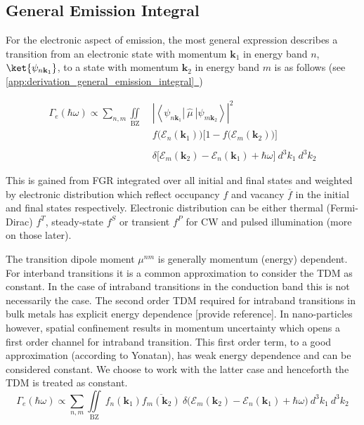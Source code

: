 \subsection{General Emission Integral}
\label{sec:general_emission_integral}

For the electronic aspect of emission, the most general expression describes a transition from an electronic state with momentum $\mathbf{k}_{1}$ in energy band $n$, $\ket{\psi_{n\mathbf{k}_{1}}}$, to a state with momentum $\mathbf{k}_{2}$ in energy band $m$ is as follows (see \hyperref[app:derivation_general_emission_integral]{\ref*{app:derivation_general_emission_integral}~})

\begin{align}
\Gamma_{e}(\hbar\omega) \propto \sum_{n, m} \iint\limits_{\text{BZ}} \;  &\left| \left\langle \psi_{n\mathbf{k}_{1}} | \ \hat{\mu} \ |\psi_{m\mathbf{k}_{2}}\right\rangle\right|^{2}  \\ &f\Big( \mathcal{E}_{n}(\mathbf{k}_{1}) \Big)\Bigg[ 1-f\Big( \mathcal{E}_{m}(\mathbf{k}_{2}) \Big)\Bigg] \\  \\ &\delta\Big[\mathcal{E}_{m}(\mathbf{k}_{2}) - \mathcal{E}_{n}(\mathbf{k}_{1}) + \hbar\omega \Big] \ d^{3}k_{1} \ d^{3}k_{2}
\label{eq:general_emission_integral}
\end{align}

This is gained from FGR integrated over all initial and final states and weighted by electronic distribution which reflect occupancy $f$ and vacancy $\overline{f}$ in the initial and final states respectively. Electronic distribution can be either thermal (Fermi-Dirac) $f^{T}$, steady-state $f^{S}$ or transient $f^{P}$ for CW and pulsed illumination (more on those later). 

The transition dipole moment $\mu^{nm}$ is generally momentum (energy) dependent. For interband transitions it is a common approximation to consider the TDM as constant. In the case of intraband transitions in the conduction band this is not necessarily the case. The second order TDM required for intraband transitions in bulk metals has explicit energy dependence [provide reference]. In nano-particles however, spatial confinement results in momentum uncertainty which opens a first order channel for intraband transition. This first order term, to a good approximation (according to Yonatan), has weak energy dependence and can be considered constant. We choose to work with the latter case and henceforth the TDM is treated as constant. 
\begin{equation}
\Gamma_{e}(\hbar\omega) \propto \sum_{n, m} \iint\limits_{\text{BZ}}  \ f_{n}(\mathbf{k}_{1})\overline{f_{m}(\mathbf{k}_{2})} \ \delta\big(\mathcal{E}_{m}(\mathbf{k}_{2}) - \mathcal{E}_{n}(\mathbf{k}_{1}) + \hbar\omega \big) \ d^{3}k_{1} \ d^{3}k_{2}
\label{eq:general_emission_integral_constant_tdm}
\end{equation}
